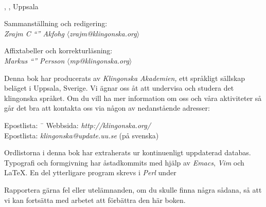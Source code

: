 %
\begin{center}
  \\
  \edition{}, \compiledate{}, Uppsala

  \vspace{4mm}
  \small Sammanställning och redigering: \\
  \textit{Zrajm C ``'' Akfohg}
  $\langle$\textit{zrajm@klingonska.org}$\rangle$ 

  \vspace{2mm}
  Affixtabeller och korrekturläsning:\\
  \textit{Markus ``'' Persson}
  $\langle$\textit{mp@klingonska.org}$\rangle$
\end{center}


\small\noindent Denna bok har producerats av \textit{Kling\-on\-ska
Aka\-demi\-en,} ett språkligt sällskap beläget i Uppsala, Sverige. Vi
ägnar oss åt att undervisa och studera det klingonska språket. Om du
vill ha mer information om oss och våra aktiviteter så går det bra att
kontakta oss via någon av nedanstående adresser:

\begin{tabbing}
\indent Epostlista: \ \= \kill
\indent Webbsida: \> \textit{http://klingonska.org/}\\
\indent Epostlista: \> \textit{klingonska@update.uu.se} (på svenska)
\end{tabbing}

\noindent Ordlistorna i denna bok har extraherats ur
kontinuenligt uppdaterad databas. Typografi och formgivning har åstadkommits
med hjälp av \textit{Emacs}, \textit{Vim} och \LaTeX. En del ytterligare
program skrevs i \textit{Perl} under 

Rapportera gärna fel eller utelämnanden, om du skulle finna några
sådana, så att vi kan fortsätta med arbetet att förbättra den här
boken.

\newpage
\normalsize
